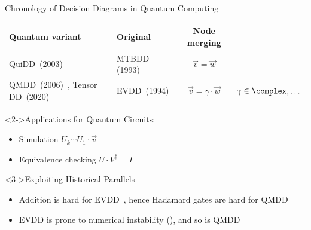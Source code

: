 \begin{refframe}{Chronology of Decision Diagrams in Quantum Computing}
	
\vspace{-.8em}

	
\begin{table}
\centering\footnotesize
\def\arraystretch{1.5}
\begin{tabular}{|p{4.5cm}|p{1.5cm}|c|c|}
\hline
\textbf{Quantum variant}	&
\textbf{Original}				& \textbf{Node merging} &  \\\hline
 QuiDD~(2003)~\cite{viamontes2003improving}					    &MTBDD (1993)  & $\vec v = \vec w$  &  \\
 QMDD~(2006)~\cite{qmdd}, Tensor DD~(2020)~\cite{hong2022tensor}   & EVDD~(1994)  &$\vec v = \gamma\cdot \vec w$   & $\gamma \in \complex, \dots$  \\
\hline
\end{tabular}
\end{table}

\vspace{-.3em}



\begin{block}<2->{Applications for Quantum Circuits:}
\begin{itemize}
	\item Simulation			\hfill   $U_k\cdots U_1 \cdot \vec v$
	\item Equivalence checking	 \hfill $U \cdot V^\dagger = I$
\end{itemize}
\end{block}


\begin{alertblock}<3->{Exploiting Historical Parallels}
	\begin{itemize}
	\item<+-> Addition is hard for EVDD~\cite{fargier2013semiring}, hence Hadamard gates are hard for QMDD
	\item<+-> EVDD is prone to numerical instability (\cite{aadd}), and so is QMDD~\cite{niemann2020overcoming}
	\end{itemize}
\end{alertblock}
\vspace{-.8em}


\end{refframe}
